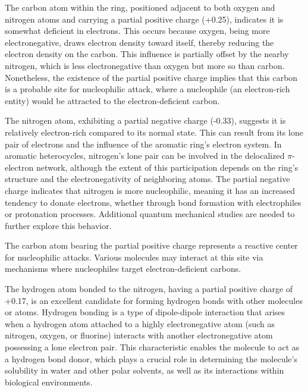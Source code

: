 The carbon atom within the ring, positioned adjacent to both oxygen and nitrogen atoms and carrying a partial positive charge (+0.25), indicates it is somewhat deficient in electrons. This occurs because oxygen, being more electronegative, draws electron density toward itself, thereby reducing the electron density on the carbon. This influence is partially offset by the nearby nitrogen, which is less electronegative than oxygen but more so than carbon. Nonetheless, the existence of the partial positive charge implies that this carbon is a probable site for nucleophilic attack, where a nucleophile (an electron-rich entity) would be attracted to the electron-deficient carbon.

The nitrogen atom, exhibiting a partial negative charge (-0.33), suggests it is relatively electron-rich compared to its normal state. This can result from its lone pair of electrons and the influence of the aromatic ring’s electron system. In aromatic heterocycles, nitrogen’s lone pair can be involved in the delocalized $\pi$-electron network, although the extent of this participation depends on the ring’s structure and the electronegativity of neighboring atoms. The partial negative charge indicates that nitrogen is more nucleophilic, meaning it has an increased tendency to donate electrons, whether through bond formation with electrophiles or protonation processes. Additional quantum mechanical studies are needed to further explore this behavior.

The carbon atom bearing the partial positive charge represents a reactive center for nucleophilic attacks. Various molecules may interact at this site via mechanisms where nucleophiles target electron-deficient carbons.

The hydrogen atom bonded to the nitrogen, having a partial positive charge of +0.17, is an excellent candidate for forming hydrogen bonds with other molecules or atoms. Hydrogen bonding is a type of dipole-dipole interaction that arises when a hydrogen atom attached to a highly electronegative atom (such as nitrogen, oxygen, or fluorine) interacts with another electronegative atom possessing a lone electron pair. This characteristic enables the molecule to act as a hydrogen bond donor, which plays a crucial role in determining the molecule’s solubility in water and other polar solvents, as well as its interactions within biological environments.

